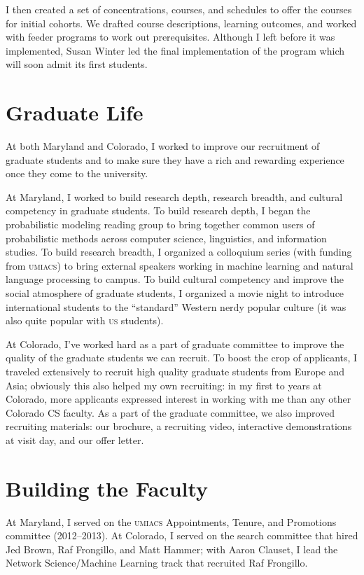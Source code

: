 \documentclass[11pt]{amsart}
\newcommand{\abr}[1]{\textsc{#1}}
\begin{document}
I then created a set of concentrations, courses, and schedules to offer the
courses for initial cohorts.  We drafted course descriptions, learning outcomes,
and worked with feeder programs to work out prerequisites.  Although I left
before it was implemented, Susan Winter led the final implementation of the
program which will soon admit its first students.

\section{Graduate Life}

At both Maryland and Colorado, I worked to improve our recruitment of graduate
students and to make sure they have a rich and rewarding experience once they
come to the university.

At Maryland, I worked to build research depth, research breadth, and cultural
competency in graduate students.  To build research depth, I began the
probabilistic modeling reading group to bring together common users of
probabilistic methods across computer science, linguistics, and information
studies.  To build research breadth, I organized a colloquium series (with
funding from \abr{umiacs}) to bring external speakers working in machine
learning and natural language processing to campus.  To build cultural
competency and improve the social atmosphere of graduate students, I organized a
movie night to introduce international students to the ``standard'' Western
nerdy popular culture (it was also quite popular with \abr{us} students).

At Colorado, I've worked hard as a part of graduate committee to improve the
quality of the graduate students we can recruit.  To boost the crop of
applicants, I traveled extensively to recruit high quality graduate students
from Europe and Asia; obviously this also helped my own recruiting: in my first
to years at Colorado, more applicants expressed interest in working with me than
any other Colorado CS faculty.  As a part of the graduate committee, we
also improved recruiting materials: our brochure, a recruiting video,
interactive demonstrations at visit day, and our offer letter.

\section{Building the Faculty}

At Maryland, I served on the \abr{umiacs} Appointments, Tenure, and Promotions
committee (2012--2013).  At Colorado, I served on the search committee that
hired Jed Brown, Raf Frongillo, and Matt Hammer; with Aaron Clauset, I lead the
Network Science/Machine Learning track that recruited Raf Frongillo.
\end{document}
